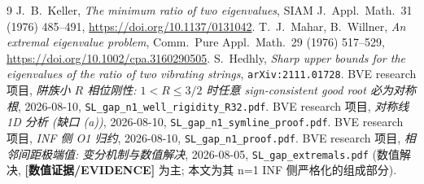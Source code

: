 \documentclass[UTF8]{ctexart}
\newcommand{\EVID}{\textbf{[数值证据/EVIDENCE]}}
\begin{document}
\begin{thebibliography}{9}\sloppy
	 J.\ B.\ Keller, \emph{The minimum ratio of two eigenvalues},
		SIAM J.\ Appl.\ Math.\ 31 (1976) 485--491, \url{https://doi.org/10.1137/0131042}.
	 T.\ J.\ Mahar, B.\ Willner, \emph{An extremal eigenvalue problem},
		Comm.\ Pure Appl.\ Math.\ 29 (1976) 517--529, \url{https://doi.org/10.1002/cpa.3160290505}.
	 S.\ Hedhly, \emph{Sharp upper bounds for the eigenvalues of the
		ratio of two vibrating strings}, \texttt{arXiv:2111.01728}.
	 BVE research 项目, \emph{阱族小 $R$ 相位刚性: $1<R\le3/2$ 时任意
		sign-consistent good root 必为对称根}, 2026-08-10,
		\texttt{SL\_gap\_n1\_well\_rigidity\_R32.pdf}.
	 BVE research 项目, \emph{对称线 1D 分析 (缺口 (a))},
		2026-08-10, \texttt{SL\_gap\_n1\_symline\_proof.pdf}.
	 BVE research 项目, \emph{INF 侧 O1 归约}, 2026-08-10,
		\texttt{SL\_gap\_n1\_proof.pdf}.
	 BVE research 项目, \emph{相邻间距极端值: 变分机制与数值解决},
		2026-08-05, \texttt{SL\_gap\_extremals.pdf} (数值解决, \EVID{} 为主;
		本文为其 n=1 INF 侧严格化的组成部分).
\end{thebibliography}
\end{document}
